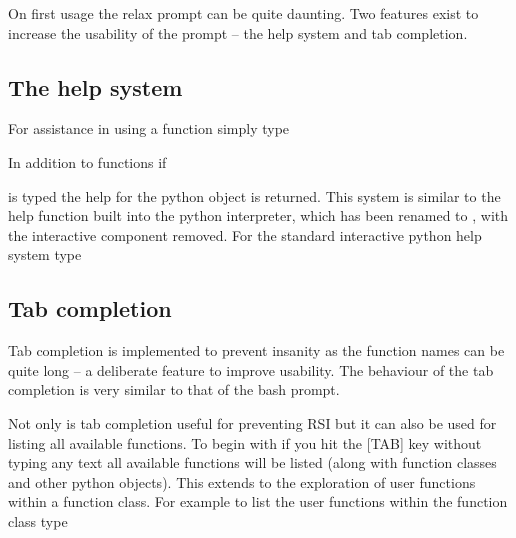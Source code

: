 
On first usage the relax prompt can be quite daunting.  Two features exist to increase the usability of the prompt -- the help system and tab completion.




\subsection{The help system}

For assistance in using a function simply type


In addition to functions if


is typed the help for the python object is returned.  This system is similar to the help function built into the python interpreter, which has been renamed to , with the interactive component removed.  For the standard interactive python help system type






\subsection{Tab completion}

Tab completion is implemented to prevent insanity as the function names can be quite long -- a deliberate feature to improve usability.  The behaviour of the tab completion is very similar to that of the bash prompt.

Not only is tab completion useful for preventing RSI but it can also be used for listing all available functions.  To begin with if you hit the [TAB] key without typing any text all available functions will be listed (along with function classes and other python objects).  This extends to the exploration of user functions within a function class.  For example to list the user functions within the function class  type

